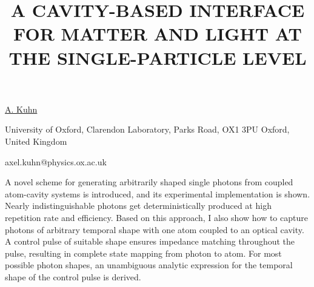 \title{A CAVITY-BASED INTERFACE FOR MATTER AND LIGHT AT THE SINGLE-PARTICLE LEVEL}

\underline{A. Kuhn}

{\normalsize{\vspace{-4mm}
University of Oxford, Clarendon Laboratory, Parks Road, OX1 3PU Oxford, United Kingdom

\email axel.kuhn@physics.ox.ac.uk}}

A novel scheme for generating arbitrarily shaped single photons from coupled atom-cavity systems is introduced, and its
experimental implementation is shown. Nearly indistinguishable photons get deterministically produced at high repetition rate and
efficiency. Based on this approach, I also show how to capture photons of arbitrary temporal shape with one atom coupled to an
optical cavity. A control pulse of suitable shape ensures impedance matching throughout the pulse, resulting in complete state
mapping from photon to atom. For most possible photon shapes,  an unambiguous analytic expression for the temporal shape of
the control pulse is derived.

\vspace{\baselineskip} 